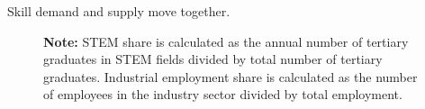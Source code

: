 \documentclass[9pt,xcolor={svgnames}]{beamer}
\begin{document}
\begin{frame}{Skill demand and supply move together.}
\begin{figure}[htbp]

    \begin{minipage}{0.7\textwidth}  %
        \footnotesize
        \textbf{Note:} STEM share is calculated as the annual number of tertiary graduates in STEM fields divided by total number of tertiary graduates. Industrial employment share is calculated as the number of employees in the industry sector divided by total employment.
    \end{minipage}
    
\end{figure}

\hyperlink{app:datasource}{}
\hyperlink{app:regression}{}

\end{frame}
\end{document}
